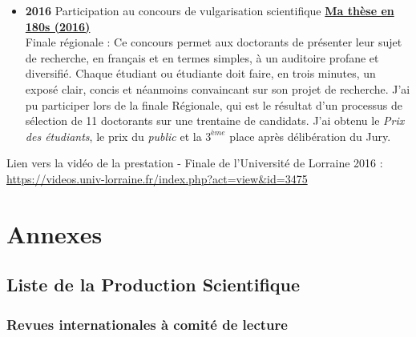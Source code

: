 \documentclass[
  12pt,
  oneside]{book}
\providecommand{\tightlist}{%
  \setlength{\itemsep}{0pt}\setlength{\parskip}{0pt}}
\begin{document}
\begin{itemize}
\tightlist
\item
  \textbf{2016} Participation au concours de vulgarisation scientifique \href{http://videos.univ-lorraine.fr/index.php?act=view&id=3475}{\textbf{Ma thèse en 180s (2016)}}\\
  Finale régionale : Ce concours permet aux doctorants de présenter leur sujet de recherche, en français et en termes simples, à un auditoire profane et diversifié. Chaque étudiant ou étudiante doit faire, en trois minutes, un exposé clair, concis et néanmoins convaincant sur son projet de recherche.
  J'ai pu participer lors de la finale Régionale, qui est le résultat d'un processus de sélection de 11 doctorants sur une trentaine de candidats.
  J'ai obtenu le \textit{Prix des étudiants}, le prix du \textit{public} et la \(3^{ème}\) place après délibération du Jury.
\end{itemize}

Lien vers la vidéo de la prestation - Finale de l'Université de Lorraine 2016 :
\url{https://videos.univ-lorraine.fr/index.php?act=view&id=3475}

\newpage

\appendix

\hypertarget{annexes}{%
\chapter*{Annexes}\label{annexes}}

\hypertarget{articles}{%
\section{Liste de la Production Scientifique}\label{articles}}

\hypertarget{revues-internationales-uxe0-comituxe9-de-lecture}{%
\subsection{Revues internationales à comité de lecture}\label{revues-internationales-uxe0-comituxe9-de-lecture}}
\end{document}

